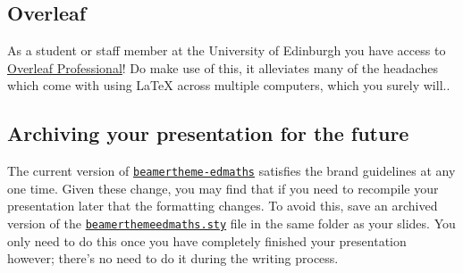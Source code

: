 \documentclass[12pt]{article}
\newcommand\pkg[1]{\href{https://www.ctan.org/pkg/#1}{\color{teal}\lstinline{#1}}}
\begin{document}
\subsection{Overleaf}

As a student or staff member at the University of Edinburgh you have access to \href{https://www.ed.ac.uk/information-services/computing/desktop-personal/software/main-software-deals/other-software/overleaf}{Overleaf Professional}! Do make use of this, it alleviates many of the headaches which come with using \LaTeX{} across multiple computers, which you surely will..

\subsection{Archiving your presentation for the future}

The current version of \pkg{beamertheme-edmaths} satisfies the brand guidelines at any one time. Given these change, you may find that if you need to recompile your presentation later that the formatting changes. To avoid this, save an archived version of the \href{https://github.com/UoE-School-of-Mathematics/LaTeX-Templates/blob/main/beamerthemeedmaths.sty}{\lstinline|beamerthemeedmaths.sty|} file in the same folder as your slides. You only need to do this once you have completely finished your presentation however; there's no need to do it during the writing process.
\end{document}
